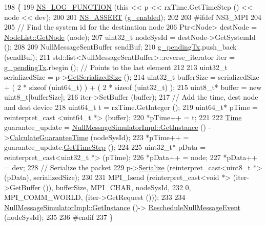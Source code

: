 \begin{DoxyCode}
198 \{
199   \hyperlink{log-macros-disabled_8h_a90b90d5bad1f39cb1b64923ea94c0761}{NS\_LOG\_FUNCTION} (\textcolor{keyword}{this} << p << rxTime.GetTimeStep () << node << dev);
200 
201   \hyperlink{assert_8h_a6dccdb0de9b252f60088ce281c49d052}{NS\_ASSERT} (\hyperlink{classns3_1_1NullMessageMpiInterface_ab4002d79e5319aae80e5bc39251ba609}{g\_enabled});
202 
203 \textcolor{preprocessor}{#ifdef NS3\_MPI}
204 
205   \textcolor{comment}{// Find the system id for the destination node}
206   Ptr<Node> destNode = \hyperlink{classns3_1_1NodeList_a80ac09977d48d29db5c704ac8483cf6c}{NodeList::GetNode} (node);
207   uint32\_t nodeSysId = destNode->GetSystemId ();
208 
209   NullMessageSentBuffer sendBuf;
210   \hyperlink{classns3_1_1NullMessageMpiInterface_ad4d5d7c2c323bb4f225b7364f8b1c824}{g\_pendingTx}.push\_back (sendBuf);
211   std::list<NullMessageSentBuffer>::reverse\_iterator iter = \hyperlink{classns3_1_1NullMessageMpiInterface_ad4d5d7c2c323bb4f225b7364f8b1c824}{g\_pendingTx}.rbegin (); \textcolor{comment}{// Points to
       the last element}
212 
213   uint32\_t serializedSize = p->\hyperlink{classns3_1_1Packet_a7416c3bc8c1a9a86c8ade4dfd1d67d2d}{GetSerializedSize} ();
214   uint32\_t bufferSize = serializedSize + ( 2 * \textcolor{keyword}{sizeof} (uint64\_t) ) + ( 2 * \textcolor{keyword}{sizeof} (uint32\_t) );
215   uint8\_t* buffer =  \textcolor{keyword}{new} uint8\_t[bufferSize];
216   iter->SetBuffer (buffer);
217   \textcolor{comment}{// Add the time, dest node and dest device}
218   uint64\_t t = rxTime.GetInteger ();
219   uint64\_t* pTime = reinterpret\_cast <uint64\_t *> (buffer);
220   *pTime++ = t;
221 
222   \hyperlink{namespacens3_1_1TracedValueCallback_a7ffd3e7c142ffe7c8a1d2db9b8de38ec}{Time} guarantee\_update = \hyperlink{classns3_1_1NullMessageSimulatorImpl_ab5e219b843d754b0e812181af6115a53}{NullMessageSimulatorImpl::GetInstance} ()
      ->\hyperlink{classns3_1_1NullMessageSimulatorImpl_a5d8006e0b0f3953887dcb525394f5dd3}{CalculateGuaranteeTime} (nodeSysId);
223   *pTime++ = guarantee\_update.\hyperlink{classns3_1_1Time_a40a7025b73dac7d02f8a4e1e54eaa5b5}{GetTimeStep} ();
224 
225   uint32\_t* pData = \textcolor{keyword}{reinterpret\_cast<}uint32\_t *\textcolor{keyword}{>} (pTime);
226   *pData++ = node;
227   *pData++ = dev;
228   \textcolor{comment}{// Serialize the packet}
229   p->\hyperlink{classns3_1_1Packet_a939e41b065c6f9f77d3f51373baeaf7e}{Serialize} (reinterpret\_cast<uint8\_t *> (pData), serializedSize);
230 
231   MPI\_Isend (reinterpret\_cast<void *> (iter->GetBuffer ()), bufferSize, MPI\_CHAR, nodeSysId,
232              0, MPI\_COMM\_WORLD, (iter->GetRequest ()));
233 
234   \hyperlink{classns3_1_1NullMessageSimulatorImpl_ab5e219b843d754b0e812181af6115a53}{NullMessageSimulatorImpl::GetInstance} ()->
      \hyperlink{classns3_1_1NullMessageSimulatorImpl_addc65b52a532801e4f2dc1fdffce2a66}{RescheduleNullMessageEvent} (nodeSysId);
235 
236 \textcolor{preprocessor}{#endif}
237 \}
\end{DoxyCode}


